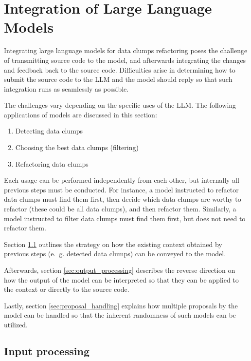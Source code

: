 \section{Integration of Large Language Models}\label{sec:implementation_tools}
Integrating large language models for data clumps refactoring poses the challenge of transmitting source code to the model, and afterwards integrating the changes and  feedback back to the source code. Difficulties arise in determining how to submit the source code to the \ac{LLM} and  the model should reply so that such integration runs as seamlessly as possible. 

The challenges vary depending on the specific uses of the \ac{LLM}. The following applications of models are discussed in this section:
\begin{enumerate}
    \item Detecting data clumps
    \item Choosing the best data clumps (filtering)
    \item Refactoring data clumps
\end{enumerate}

Each usage can be performed independently from each other, but internally all previous steps must be conducted. For instance, a model instructed to refactor data clumps must find them first, then decide which data clumps are worthy to refactor (these could be all data clumps), and then refactor them. Similarly, a model instructed to filter data clumps must find them first, but does not need to refactor them.

Section \ref{sec:input_format} outlines the strategy on how the existing context obtained by previous steps (e.~g. detected data clumps) can be conveyed to the model.

Afterwards, section \ref{sec:output_processing} describes the reverse direction on how the output of the model can be interpreted so that they can be applied to the context or directly to the source code. 

Lastly, section \ref{sec:proposal_handling} explains how multiple proposals by the model can be handled so that the inherent randomness of such models can be utilized. 

\subsection{Input processing}\label{sec:input_format}

